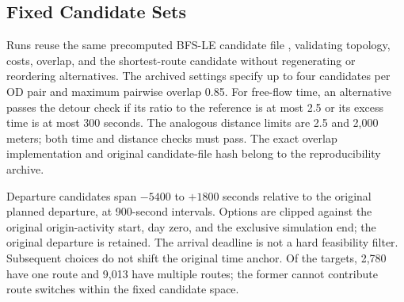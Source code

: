 \subsection{Fixed Candidate Sets}

Runs reuse the same precomputed BFS-LE candidate file \cite{rieser2013route}, validating topology, costs, overlap, and the shortest-route candidate without regenerating or reordering alternatives. The archived settings specify up to four candidates per OD pair and maximum pairwise overlap 0.85. For free-flow time, an alternative passes the detour check if its ratio to the reference is at most 2.5 or its excess time is at most 300 seconds. The analogous distance limits are 2.5 and 2,000 meters; both time and distance checks must pass. The exact overlap implementation and original candidate-file hash belong to the reproducibility archive.

Departure candidates span $-5400$ to $+1800$ seconds relative to the original planned departure, at 900-second intervals. Options are clipped against the original origin-activity start, day zero, and the exclusive simulation end; the original departure is retained. The arrival deadline is not a hard feasibility filter. Subsequent choices do not shift the original time anchor. Of the targets, 2,780 have one route and 9,013 have multiple routes; the former cannot contribute route switches within the fixed candidate space.


